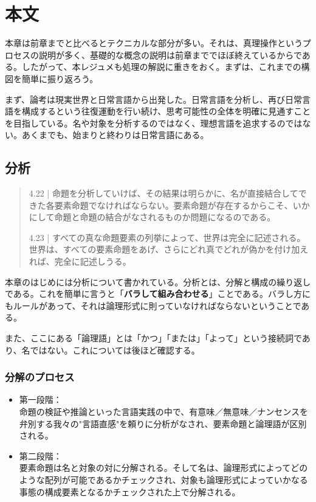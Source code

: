 \documentclass[a4paper,onecolumn,openany,article]{jsarticle}
\begin{document}
\section{本文}
本章は前章までと比べるとテクニカルな部分が多い。それは、真理操作というプロセスの説明が多く、基礎的な概念の説明は前章まででほぼ終えているからである。したがって、本レジュメも処理の解説に重きをおく。まずは、これまでの構図を簡単に振り返ろう。

まず、論考は現実世界と日常言語から出発した。日常言語を分析し、再び日常言語を構成するという往復運動を行い続け、思考可能性の全体を明確に見通すことを目指している。名や対象を分析するのではなく、理想言語を追求するのではない。あくまでも、始まりと終わりは日常言語にある。

\subsection{分析}

\begin{quote}

4.22 | 命題を分析していけば、その結果は明らかに、名が直接結合してできた各要素命題でなければならない。要素命題が存在するからこそ、いかにして命題と命題の結合がなされるものか問題になるのである。

4.23 | すべての真な命題要素の列挙によって、世界は完全に記述される。世界は、すべての要素命題をあげ、さらにどれ真でどれが偽かを付け加えれば、完全に記述しうる。


\end{quote}

本章のはじめには分析について書かれている。分析とは、分解と構成の繰り返しである。これを簡単に言うと「{\bf{バラして組み合わせる}}」ことである。バラし方にもルールがあって、それは論理形式に則っていなければならないということである。

また、ここにある「論理語」とは「かつ」「または」「よって」という接続詞であり、名ではない。これについては後ほど確認する。


\subsubsection{分解のプロセス}

\begin{itemize}

\item 第一段階：\\命題の検証や推論といった言語実践の中で、有意味／無意味／ナンセンスを弁別する我々の"言語直感"を頼りに分析がなされ、要素命題と論理語が区別される。

\item 第二段階：\\要素命題は名と対象の対に分解される。そして名は、論理形式によってどのような配列が可能であるかチェックされ、対象も論理形式によっていかなる事態の構成要素となるかチェックされた上で分解される。

\end{itemize}
\end{document}
